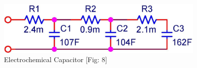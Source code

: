 \begin{figure}[ht!]
\includegraphics[keepaspectratio=true,width=4in]{./figures/parameters/superCap.jpg}
\centering
\caption{Electrochemical Capacitor \cite{electrochem_intro}[Fig: 8]}
\label{fig:superCap}
\end{figure}


